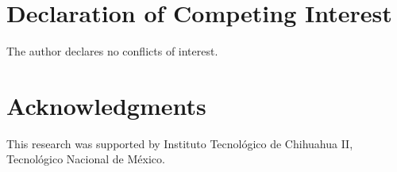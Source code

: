 \documentclass[review,3p,times]{elsarticle}
\begin{document}
\section*{Declaration of Competing Interest}
The author declares no conflicts of interest.

\section*{Acknowledgments}
This research was supported by Instituto Tecnológico de Chihuahua II, Tecnológico Nacional de México.



\end{document}
